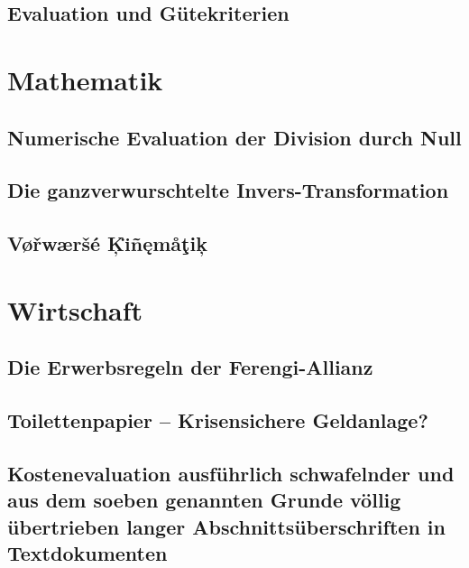 		\subsection{Evaluation und Gütekriterien}
			\blindtext
		
	\section{Mathematik}
		\subsection{Numerische Evaluation der Division durch Null}
			\blindtext
		\subsection{Die ganzverwurschtelte Invers-Transformation}
			\blindtext
		\subsection{V\o{}\v{r}w\ae{}r\v{s}\'{e} \c{K}\"{\i}\~{n}\k{e}m\aa{}\c{t}i\c{k}}
			\blindtext
		
	\section{Wirtschaft}
		\subsection{Die Erwerbsregeln der Ferengi-Allianz}
			\blindtext
			
		\subsection{Toilettenpapier -- Krisensichere Geldanlage?}
			\blindtext
			
		\subsection{Kostenevaluation ausführlich schwafelnder und aus dem soeben genannten Grunde völlig übertrieben langer Abschnittsüberschriften in Textdokumenten}
			\blindtext
			

		
